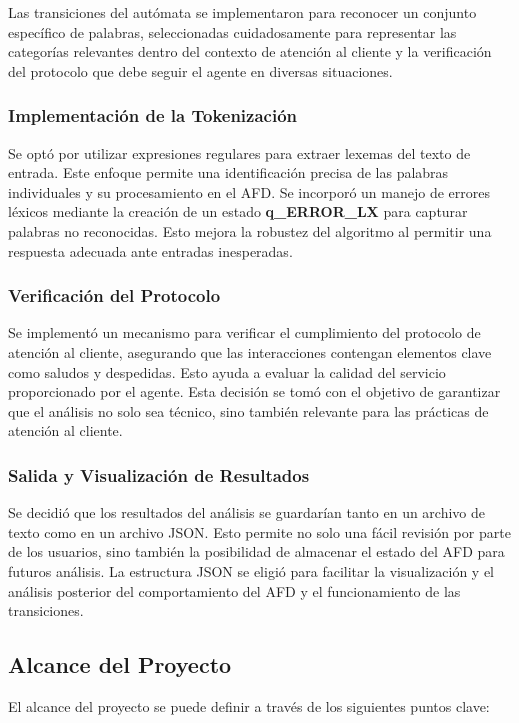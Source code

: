 \documentclass[12pt,a4paper]{article}
\begin{document}
Las transiciones del autómata se implementaron para reconocer un conjunto específico de
palabras, seleccionadas cuidadosamente para representar las categorías relevantes dentro del
contexto de atención al cliente y la verificación del protocolo que debe seguir el agente en
diversas situaciones.

\subsubsection{Implementación de la Tokenización}
Se optó por utilizar expresiones regulares para extraer lexemas del texto de entrada. Este
enfoque permite una identificación precisa de las palabras individuales y su procesamiento en
el AFD. Se incorporó un manejo de errores léxicos mediante la creación de un estado
\textbf{q\_ERROR\_LX} para capturar palabras no reconocidas. Esto mejora la robustez del
algoritmo al permitir una respuesta adecuada ante entradas inesperadas.

\subsubsection{Verificación del Protocolo}
Se implementó un mecanismo para verificar el cumplimiento del protocolo de atención al cliente,
asegurando que las interacciones contengan elementos clave como saludos y despedidas. Esto
ayuda a evaluar la calidad del servicio proporcionado por el agente. Esta decisión se tomó con
el objetivo de garantizar que el análisis no solo sea técnico, sino también relevante para las
prácticas de atención al cliente.

\subsubsection{Salida y Visualización de Resultados}
Se decidió que los resultados del análisis se guardarían tanto en un archivo de texto como en
un archivo JSON. Esto permite no solo una fácil revisión por parte de los usuarios, sino
también la posibilidad de almacenar el estado del AFD para futuros análisis. La estructura JSON
se eligió para facilitar la visualización y el análisis posterior del comportamiento del AFD y
el funcionamiento de las transiciones.

\subsection{Alcance del Proyecto}
El alcance del proyecto se puede definir a través de los siguientes puntos clave:
\end{document}

